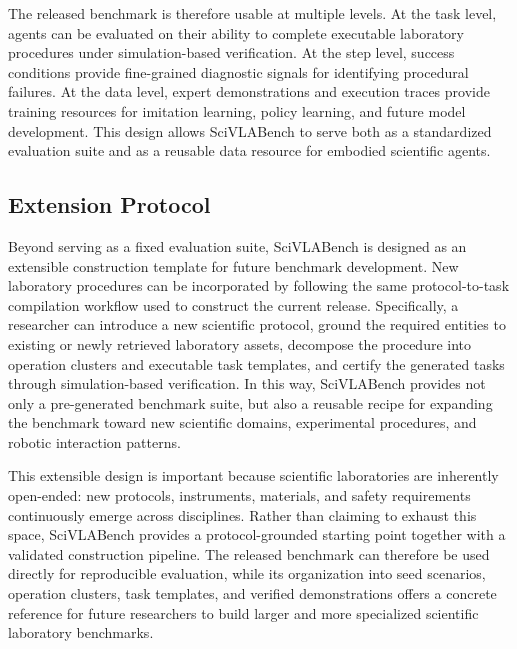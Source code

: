 The released benchmark is therefore usable at multiple levels. At the task level, agents can be evaluated on their ability to complete executable laboratory procedures under simulation-based verification. At the step level, success conditions provide fine-grained diagnostic signals for identifying procedural failures. At the data level, expert demonstrations and execution traces provide training resources for imitation learning, policy learning, and future model development. This design allows SciVLABench to serve both as a standardized evaluation suite and as a reusable data resource for embodied scientific agents.

\subsection{Extension Protocol}
\label{sec:extension-protocol}

Beyond serving as a fixed evaluation suite, SciVLABench is designed as an extensible construction template for future benchmark development. New laboratory procedures can be incorporated by following the same protocol-to-task compilation workflow used to construct the current release. Specifically, a researcher can introduce a new scientific protocol, ground the required entities to existing or newly retrieved laboratory assets, decompose the procedure into operation clusters and executable task templates, and certify the generated tasks through simulation-based verification. In this way, SciVLABench provides not only a pre-generated benchmark suite, but also a reusable recipe for expanding the benchmark toward new scientific domains, experimental procedures, and robotic interaction patterns.

This extensible design is important because scientific laboratories are inherently open-ended: new protocols, instruments, materials, and safety requirements continuously emerge across disciplines. Rather than claiming to exhaust this space, SciVLABench provides a protocol-grounded starting point together with a validated construction pipeline. The released benchmark can therefore be used directly for reproducible evaluation, while its organization into seed scenarios, operation clusters, task templates, and verified demonstrations offers a concrete reference for future researchers to build larger and more specialized scientific laboratory benchmarks.